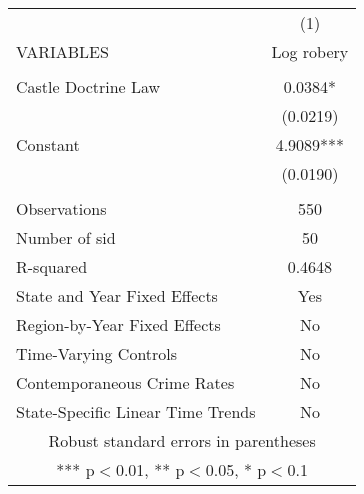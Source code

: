 \documentclass[]{article}
\begin{document}
\begin{tabular}{lc} \hline
 & (1) \\
VARIABLES & Log robery \\ \hline
 &  \\
Castle Doctrine Law & 0.0384* \\
 & (0.0219) \\
Constant & 4.9089*** \\
 & (0.0190) \\
 &  \\
Observations & 550 \\
Number of sid & 50 \\
R-squared & 0.4648 \\
State and Year Fixed Effects & Yes \\
Region-by-Year Fixed Effects & No \\
Time-Varying Controls & No \\
Contemporaneous Crime Rates & No \\
 State-Specific Linear Time Trends & No \\ \hline
\multicolumn{2}{c}{ Robust standard errors in parentheses} \\
\multicolumn{2}{c}{ *** p$<$0.01, ** p$<$0.05, * p$<$0.1} \\
\end{tabular}
\end{document}
